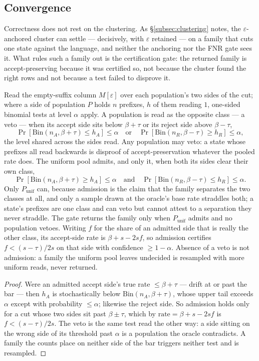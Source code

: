 \subsection{Convergence}

Correctness does not rest on the clustering. As \S\ref{subsec:clustering} notes, the
$\varepsilon$-anchored cluster can settle --- decisively, with $\varepsilon$ retained
--- on a family that cuts one state against the language, and neither the anchoring nor
the FNR gate sees it. What rules such a family out is the certification gate: the
returned family is accept-preserving because it was certified so, not because the
cluster found the right rows and not because a test failed to disprove it.

\begin{lemma}\label{lem:certify}
Read the empty-suffix column $M[\varepsilon]$ over each population's two sides of the cut;
where a side of population $P$ holds $n$ prefixes, $h$ of them reading $1$, one-sided
binomial tests at level $\alpha$ apply. A population is read as the opposite class ---
a veto --- when its accept side sits below $\beta+\tau$ or its reject side above
$\beta-\tau$,
\[
   \Pr[\mathrm{Bin}(n_A,\beta+\tau)\le h_A]\le\alpha
   \quad\text{or}\quad
   \Pr[\mathrm{Bin}(n_R,\beta-\tau)\ge h_R]\le\alpha ,
\]
the level shared across the sides read. Any population may veto: a state whose prefixes
all read backwards is disproof of accept-preservation whatever the pooled rate does. The
uniform pool admits, and only it, when both its sides clear their own class,
\[
   \Pr[\mathrm{Bin}(n_A,\beta+\tau)\ge h_A]\le\alpha
   \quad\text{and}\quad
   \Pr[\mathrm{Bin}(n_R,\beta-\tau)\le h_R]\le\alpha .
\]
Only $P_{\mathrm{unif}}$ can, because admission is the claim that the family separates the
two classes at all, and only a sample drawn at the oracle's base rate straddles both; a
state's prefixes are one class and can veto but cannot attest to a separation they never
straddle. The gate returns the family only when $P_{\mathrm{unif}}$ admits and no
population vetoes. Writing $f$ for the share of an admitted side that is really the other
class, its accept-side rate is $\beta+s-2sf$, so admission certifies $f<(s-\tau)/2s$ on
that side with confidence $\ge1-\alpha$. Absence of a veto is not admission: a family the
uniform pool leaves undecided is resampled with more uniform reads, never returned.
\end{lemma}
\begin{proof}
Were an admitted accept side's true rate $\le\beta+\tau$ --- drift at or past the bar ---
then $h_A$ is stochastically below $\mathrm{Bin}(n_A,\beta+\tau)$, whose upper tail
exceeds $\alpha$ except with probability $\le\alpha$; likewise the reject side. So
admission holds only for a cut whose two sides sit past $\beta\pm\tau$, which by
$\text{rate}=\beta+s-2sf$ is $f<(s-\tau)/2s$. The veto is the same test read the other
way: a side sitting on the wrong side of its threshold past $\alpha$ is a population the
oracle contradicts. A family the counts place on neither side of the bar triggers neither
test and is resampled.
\end{proof}

